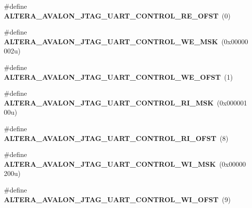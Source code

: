 \begin{DoxyCompactItemize}
\item 
\mbox{\label{group__RTEMSBSPsNios2ISS_ga21181441c71deb94d47862d49ea38011}} 
\#define {\bfseries A\+L\+T\+E\+R\+A\+\_\+\+A\+V\+A\+L\+O\+N\+\_\+\+J\+T\+A\+G\+\_\+\+U\+A\+R\+T\+\_\+\+C\+O\+N\+T\+R\+O\+L\+\_\+\+R\+E\+\_\+\+O\+F\+ST}~(0)
\item 
\mbox{\label{group__RTEMSBSPsNios2ISS_ga3d291bd0598d6df0220b382aea966da6}} 
\#define {\bfseries A\+L\+T\+E\+R\+A\+\_\+\+A\+V\+A\+L\+O\+N\+\_\+\+J\+T\+A\+G\+\_\+\+U\+A\+R\+T\+\_\+\+C\+O\+N\+T\+R\+O\+L\+\_\+\+W\+E\+\_\+\+M\+SK}~(0x00000002u)
\item 
\mbox{\label{group__RTEMSBSPsNios2ISS_ga1252447533837f3d2d17ff7f439f1e4c}} 
\#define {\bfseries A\+L\+T\+E\+R\+A\+\_\+\+A\+V\+A\+L\+O\+N\+\_\+\+J\+T\+A\+G\+\_\+\+U\+A\+R\+T\+\_\+\+C\+O\+N\+T\+R\+O\+L\+\_\+\+W\+E\+\_\+\+O\+F\+ST}~(1)
\item 
\mbox{\label{group__RTEMSBSPsNios2ISS_ga9c1e16286e2efa4b1a5f7cf457436cf5}} 
\#define {\bfseries A\+L\+T\+E\+R\+A\+\_\+\+A\+V\+A\+L\+O\+N\+\_\+\+J\+T\+A\+G\+\_\+\+U\+A\+R\+T\+\_\+\+C\+O\+N\+T\+R\+O\+L\+\_\+\+R\+I\+\_\+\+M\+SK}~(0x00000100u)
\item 
\mbox{\label{group__RTEMSBSPsNios2ISS_ga322b500757b002d1295f5772fea55dfd}} 
\#define {\bfseries A\+L\+T\+E\+R\+A\+\_\+\+A\+V\+A\+L\+O\+N\+\_\+\+J\+T\+A\+G\+\_\+\+U\+A\+R\+T\+\_\+\+C\+O\+N\+T\+R\+O\+L\+\_\+\+R\+I\+\_\+\+O\+F\+ST}~(8)
\item 
\mbox{\label{group__RTEMSBSPsNios2ISS_ga05111b3bb26282e2c4e364fc5e7cdf0b}} 
\#define {\bfseries A\+L\+T\+E\+R\+A\+\_\+\+A\+V\+A\+L\+O\+N\+\_\+\+J\+T\+A\+G\+\_\+\+U\+A\+R\+T\+\_\+\+C\+O\+N\+T\+R\+O\+L\+\_\+\+W\+I\+\_\+\+M\+SK}~(0x00000200u)
\item 
\mbox{\label{group__RTEMSBSPsNios2ISS_ga3e12a23c5961d1e4907828fc636bffaa}} 
\#define {\bfseries A\+L\+T\+E\+R\+A\+\_\+\+A\+V\+A\+L\+O\+N\+\_\+\+J\+T\+A\+G\+\_\+\+U\+A\+R\+T\+\_\+\+C\+O\+N\+T\+R\+O\+L\+\_\+\+W\+I\+\_\+\+O\+F\+ST}~(9)
\item 
\mbox{\label{group__RTEMSBSPsNios2ISS_ga3d3b13cd17e637f9b83ff3972999fed7}} 

\end{DoxyCompactItemize}
